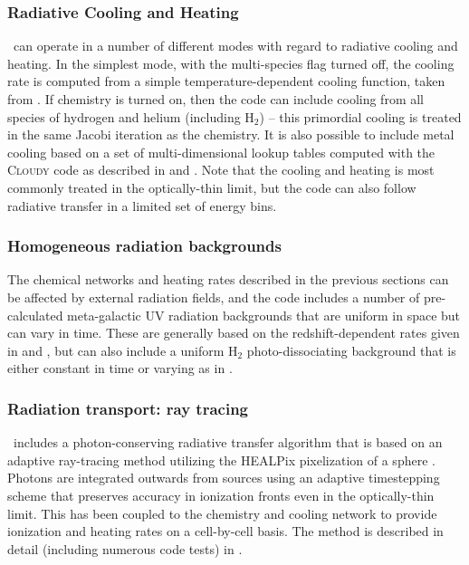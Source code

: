 \subsubsection{Radiative Cooling and Heating}

\enzo\ can operate in a number of different modes with regard to
radiative cooling and heating. In the simplest mode, with the
multi-species flag turned off, the cooling rate is computed from a
simple temperature-dependent cooling function, taken from
\citet{SW87}.  If chemistry is turned on, then the code can include
cooling from all species of hydrogen and helium (including H$_2$) --
this primordial cooling is treated in the same Jacobi iteration as the
chemistry.  It is also possible to include metal cooling based on a
set of multi-dimensional lookup tables computed with the
\textsc{Cloudy} code \citep{1998PASP..110..761F} as described in
\citet{2008MNRAS.385.1443S} and \citet{2011ApJ...731....6S}. Note that
the cooling and heating is most commonly treated in the optically-thin
limit, but the code can also follow radiative transfer in a limited
set of energy bins.

\subsubsection{Homogeneous radiation backgrounds}

The chemical networks and heating rates described in the previous
sections can be affected by external radiation fields, and the code
includes a number of pre-calculated meta-galactic UV radiation
backgrounds that are uniform in space but can vary in time.  These are
generally based on the redshift-dependent rates given in
\citet{1996ApJ...461...20H} and \citet{2012ApJ...746..125H}, but can
also include a uniform H$_2$ photo-dissociating background that is
either constant in time or varying as in \citet{WiseAbel05}.

\subsubsection{Radiation transport: ray tracing}

\enzo\ includes a photon-conserving radiative transfer algorithm that
is based on an adaptive ray-tracing method utilizing the HEALPix
pixelization of a sphere \citep{AbelWandelt02}. Photons are integrated
outwards from sources using an adaptive timestepping scheme that
preserves accuracy in ionization fronts even in the optically-thin
limit. This has been coupled to the chemistry and cooling network to
provide ionization and heating rates on a cell-by-cell basis. The
method is described in detail (including numerous code tests) in
\citet{Wise11_Moray}.

